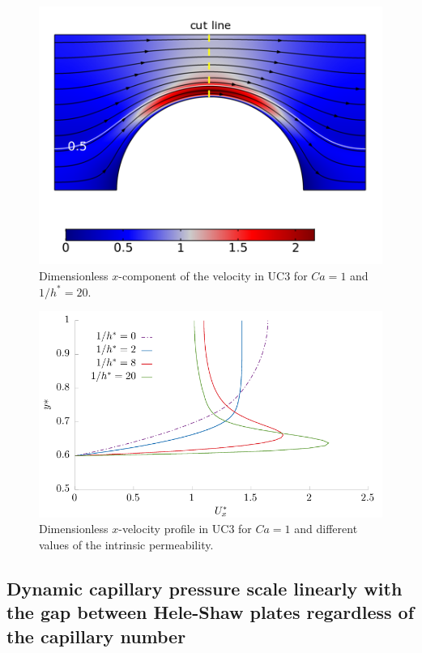 \documentclass[]{article}
\begin{document}
\begin{figure}
\hypertarget{fig:UvelocityCa1LH20}{%
\centering
\includegraphics{figures/png/Uvelocity_Ca1LH20.png}
\caption{Dimensionless \(x\)-component of the velocity in UC3 for
\(Ca=1\) and \(1/h^*=20\).}\label{fig:UvelocityCa1LH20}
}
\end{figure}

\begin{figure}
\hypertarget{fig:uprofileCa1}{%
\centering
\includegraphics{figures/pdf/uprofileCa1.pdf}
\caption{Dimensionless \(x\)-velocity profile in UC3 for \(Ca=1\) and
different values of the intrinsic permeability.}\label{fig:uprofileCa1}
}
\end{figure}

\hypertarget{dynamic-capillary-pressure-scale-linearly-with-the-gap-between-hele-shaw-plates-regardless-of-the-capillary-number}{%
\subsection{Dynamic capillary pressure scale linearly with the gap
between Hele-Shaw plates regardless of the capillary
number}\label{dynamic-capillary-pressure-scale-linearly-with-the-gap-between-hele-shaw-plates-regardless-of-the-capillary-number}}
\end{document}
